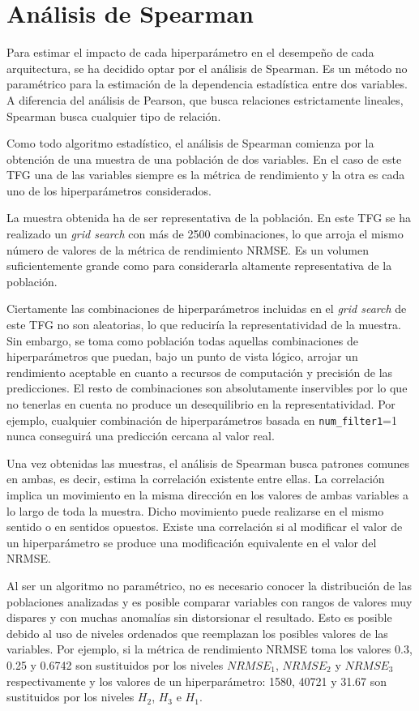 \section{Análisis de Spearman}
Para estimar el impacto de cada hiperparámetro en el desempeño de cada arquitectura, se ha decidido optar por el análisis de Spearman. Es un método no paramétrico para la estimación de la dependencia estadística entre dos variables. A diferencia del análisis de Pearson, que busca relaciones estrictamente lineales, Spearman busca cualquier tipo de relación.

Como todo algoritmo estadístico, el análisis de Spearman comienza por la obtención de una muestra de una población de dos variables. En el caso de este TFG una de las variables siempre es la métrica de rendimiento y la otra es cada uno de los hiperparámetros considerados.

La muestra obtenida ha de ser representativa de la población. En este TFG se ha realizado un \textit{grid search} con más de 2500 combinaciones, lo que arroja el mismo número de valores de la métrica de rendimiento NRMSE. Es un volumen suficientemente grande como para considerarla altamente representativa de la población.

Ciertamente las combinaciones de hiperparámetros incluidas en el \textit{grid search} de este TFG no son aleatorias, lo que reduciría la representatividad de la muestra. Sin embargo, se toma como población todas aquellas combinaciones de hiperparámetros que puedan, bajo un punto de vista lógico, arrojar un rendimiento aceptable en cuanto a recursos de computación y precisión de las predicciones. El resto de combinaciones son absolutamente inservibles por lo que no tenerlas en cuenta no produce un desequilibrio en la representatividad. Por ejemplo, cualquier combinación de hiperparámetros basada en \texttt{num\_filter1}=1 nunca conseguirá una predicción cercana al valor real.

Una vez obtenidas las muestras, el análisis de Spearman busca patrones comunes en ambas, es decir, estima la correlación existente entre ellas. La correlación implica un movimiento en la misma dirección en los valores de ambas variables a lo largo de toda la muestra. Dicho movimiento puede realizarse en el mismo sentido o en sentidos opuestos. Existe una correlación si al modificar el valor de un hiperparámetro se produce una modificación equivalente en el valor del NRMSE.

Al ser un algoritmo no paramétrico, no es necesario conocer la distribución de las poblaciones analizadas y es posible comparar variables con rangos de valores muy dispares y con muchas anomalías sin distorsionar el resultado. Esto es posible debido al uso de niveles ordenados que reemplazan los posibles valores de las variables. Por ejemplo, si la métrica de rendimiento NRMSE toma los valores 0.3, 0.25 y 0.6742 son sustituidos por los niveles $NRMSE_1$, $NRMSE_2$ y $NRMSE_3$ respectivamente y los valores de un hiperparámetro: 1580, 40721 y 31.67 son sustituidos por los niveles $H_2$, $H_3$ e $H_1$.

